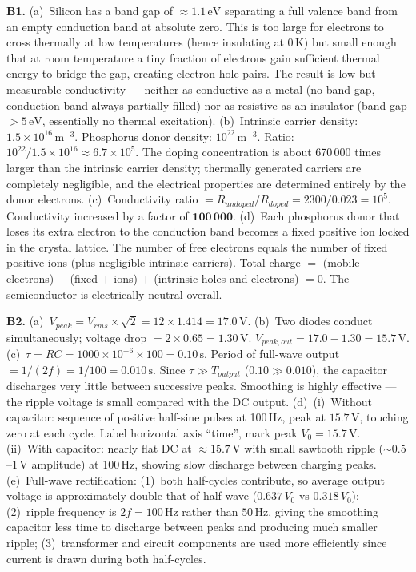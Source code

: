 \textbf{B1.}
(a)~Silicon has a band gap of $\approx1.1\,\text{eV}$
separating a full valence band from an empty conduction
band at absolute zero. This is too large for electrons
to cross thermally at low temperatures (hence insulating
at 0\,K) but small enough that at room temperature
a tiny fraction of electrons gain sufficient thermal
energy to bridge the gap, creating electron-hole pairs.
The result is low but measurable conductivity --- neither
as conductive as a metal (no band gap, conduction band
always partially filled) nor as resistive as an insulator
(band gap $>5\,\text{eV}$, essentially no thermal
excitation). \quad
(b)~Intrinsic carrier density: $1.5\times10^{16}\,\text{m}^{-3}$.
Phosphorus donor density: $10^{22}\,\text{m}^{-3}$.
Ratio: $10^{22}/1.5\times10^{16}\approx6.7\times10^5$.
The doping concentration is about 670\,000 times
larger than the intrinsic carrier density; thermally
generated carriers are completely negligible, and the
electrical properties are determined entirely by the
donor electrons. \quad
(c)~Conductivity ratio $=R_{undoped}/R_{doped}
=2300/0.023=10^5$.
Conductivity increased by a factor of
$\mathbf{100\,000}$. \quad
(d)~Each phosphorus donor that loses its extra
electron to the conduction band becomes a fixed
positive ion locked in the crystal lattice. The
number of free electrons equals the number of
fixed positive ions (plus negligible intrinsic
carriers). Total charge
$=$ (mobile electrons) $+$ (fixed $+$ ions) $+$
(intrinsic holes and electrons) $= 0$.
The semiconductor is electrically neutral overall.

\textbf{B2.}
(a)~$V_{peak}=V_{rms}\times\sqrt{2}
=12\times1.414=17.0\,\text{V}$. \quad
(b)~Two diodes conduct simultaneously; voltage drop
$=2\times0.65=1.30\,\text{V}$.
$V_{peak,out}=17.0-1.30=15.7\,\text{V}$. \quad
(c)~$\tau=RC=1000\times10^{-6}\times100
=0.10\,\text{s}$.
Period of full-wave output $=1/(2f)=1/100
=0.010\,\text{s}$.
Since $\tau\gg T_{output}$ ($0.10\gg0.010$), the
capacitor discharges very little between successive
peaks. Smoothing is highly effective --- the ripple
voltage is small compared with the DC output. \quad
(d)~(i)~Without capacitor: sequence of positive
half-sine pulses at 100\,Hz, peak at $15.7\,\text{V}$,
touching zero at each cycle. Label horizontal axis
``time'', mark peak $V_0=15.7\,\text{V}$. \\
(ii)~With capacitor: nearly flat DC at $\approx15.7\,\text{V}$
with small sawtooth ripple ($\sim0.5$--$1\,\text{V}$
amplitude) at 100\,Hz, showing slow discharge between
charging peaks. \quad
(e)~Full-wave rectification: (1)~both half-cycles
contribute, so average output voltage is approximately
double that of half-wave ($0.637\,V_0$ vs
$0.318\,V_0$); (2)~ripple frequency is $2f=100\,\text{Hz}$
rather than $50\,\text{Hz}$, giving the smoothing
capacitor less time to discharge between peaks and
producing much smaller ripple; (3)~transformer and
circuit components are used more efficiently since
current is drawn during both half-cycles.

